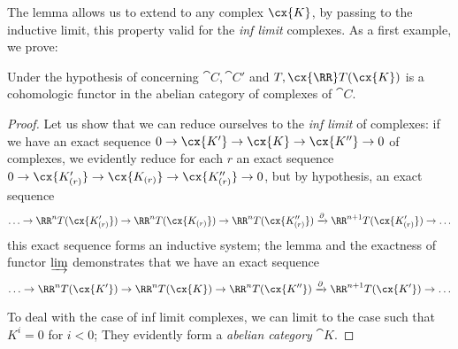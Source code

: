 The lemma  allows us to extend to any complex $\cx{K}$, by passing to the inductive limit,  
this property valid for the \emph{inf limit} complexes.
As a first example, we prove:

\begin{proposition}[11.5.2]
\label{0.11.5.2}
Under the hypothesis of  concerning $\cat{C}, \cat{C'}$ and $T, \cx{\RR} T(\cx{K})$ 
is a cohomologic functor in the abelian category of complexes of $\cat{C}$.
\end{proposition}

\begin{proof}
Let us show that we can reduce ourselves to the \emph{inf limit} of complexes: 
if we have an exact sequence $0 \rightarrow \cx{K'} \rightarrow \cx{K} \rightarrow \cx{K''} \rightarrow 0$ of complexes, 
we evidently reduce for each $r$ an exact sequence $0 \rightarrow \cx{K'_{(r)}} \rightarrow \cx{K_{(r)}} \rightarrow \cx{K''_{(r)}} \rightarrow 0$, 
but by hypothesis, an exact sequence
\[
  \ldots \rightarrow \RR^n T(\cx{K'_{(r)}}) \rightarrow \RR^n T(\cx{K_{(r)}}) \rightarrow \RR^n T(\cx{K''_{(r)}}) \xrightarrow[]{\partial} \RR^{n+1} T(\cx{K'_{(r)}}) \rightarrow \ldots
\]
this exact sequence forms an inductive system; the lemma  and the exactness of functor $\varinjlim$ demonstrates that we have an exact sequence
\[
  \ldots \rightarrow \RR^n T(\cx{K'}) \rightarrow \RR^n T(\cx{K}) \rightarrow \RR^n T(\cx{K''}) \xrightarrow[]{\partial} \RR^{n+1} T(\cx{K'}) \rightarrow \ldots
\]

To deal with the case of inf limit complexes, we can limit to the case such that $K^i=0$ for $i<0$;
They evidently form a \emph{abelian category} $\cat{K}$.
\end{proof}

